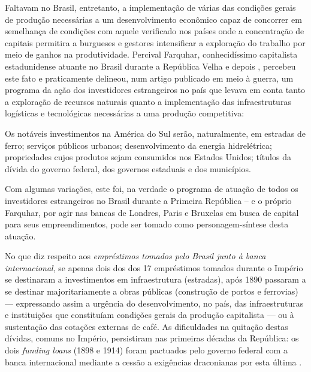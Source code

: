 Faltavam no Brasil, entretanto, a implementação de várias das condições gerais de produção necessárias a um desenvolvimento econômico capaz de concorrer em semelhança de condições com aquele verificado nos países onde a concentração de capitais permitira a burgueses e gestores intensificar a exploração do trabalho por meio de ganhos na produtividade. Percival Farquhar, conhecidíssimo capitalista estadunidense atuante no Brasil durante a República Velha e depois \cite[pp~28, 35-41, 53-54, 60-61, 76, 83-84, 121, 150-152]{CUNHA2011}, percebeu este fato e praticamente delineou, num artigo publicado em meio à guerra, um programa da ação dos investidores estrangeiros no país que levava em conta tanto a exploração de recursos naturais quanto a implementação das infraestruturas logísticas e tecnológicas necessárias a uma produção competitiva:

\begin{citacao}
Os notáveis investimentos na América do Sul serão, naturalmente, em estradas de ferro; serviços públicos urbanos; desenvolvimento da energia hidrelétrica; propriedades cujos produtos sejam consumidos nos Estados Unidos; títulos da dívida do governo federal, dos governos estaduais e dos municípios. \cite[p.~398]{farquhar_invest_1916}
\end{citacao}

Com algumas variações, este foi, na verdade o programa de atuação de todos os investidores estrangeiros no Brasil durante a Primeira República -- e o próprio Farquhar, por agir nas bancas de Londres, Paris e Bruxelas em busca de capital para seus empreendimentos, pode ser tomado como personagem-síntese desta atuação.

No que diz respeito aos \textit{empréstimos tomados pelo Brasil junto à banca internacional}, se apenas dois dos dos 17 empréstimos tomados durante o Império se destinaram a investimentos em infraestrutura (estradas), após 1890 passaram a se destinar majoritariamente a obras públicas (construção de portos e ferrovias) --- expressando assim a urgência do desenvolvimento, no país, das infraestruturas e instituições que constituíam condições gerais da produção capitalista --- ou à sustentação das cotações externas de café. As dificuldades na quitação destas dívidas, comuns no Império, persistiram nas primeiras décadas da República: os dois \textit{funding loans} (1898 e 1914) foram pactuados pelo governo federal com a banca internacional mediante a cessão a exigências draconianas por esta última \cite[p.~365]{singer_braecomu_1977}.


